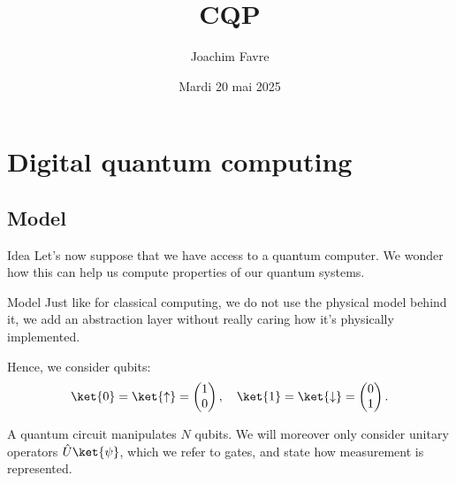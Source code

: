 \documentclass[a4paper]{article}
\title{CQP}
\author{Joachim Favre}
\date{Mardi 20 mai 2025}
\begin{document}
\maketitle


\section{Digital quantum computing}

\subsection{Model}

\begin{parag}{Idea}
    Let's now suppose that we have access to a quantum computer. We wonder how this can help us compute properties of our quantum systems.
\end{parag}

\begin{parag}{Model}
    Just like for classical computing, we do not use the physical model behind it, we add an abstraction layer without really caring how it's physically implemented. 

    Hence, we consider qubits: 
    \[\ket{0} = \ket{\uparrow} = \begin{pmatrix} 1 \\ 0 \end{pmatrix}, \mathspace \ket{1} = \ket{\downarrow} = \begin{pmatrix} 0 \\ 1 \end{pmatrix}.\]
    
    A quantum circuit manipulates $N$ qubits. We will moreover only consider unitary operators $\hat{U} \ket{\psi}$, which we refer to gates, and state how measurement is represented.
\end{parag}
\end{document}
